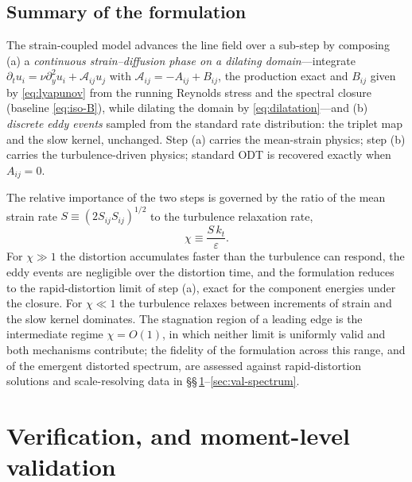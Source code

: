 \documentclass[lineno]{JFM-FLM_Au}
\begin{document}
\subsection{Summary of the formulation}\label{sec:summary}

The strain-coupled model advances the line field over a sub-step by
composing (a) a \emph{continuous strain--diffusion phase on a dilating
domain}---integrate
$\partial_t u_i=\nu\partial_y^2u_i+\mathcal{A}_{ij}u_j$ with
$\mathcal{A}_{ij}=-A_{ij}+B_{ij}$, the production exact and $B_{ij}$
given by \eqref{eq:lyapunov} from the running Reynolds stress and the
spectral closure (baseline \eqref{eq:iso-B}), while dilating the domain
by \eqref{eq:dilatation}---and (b) \emph{discrete eddy events} sampled
from the standard rate distribution: the triplet map and the slow kernel,
unchanged. Step (a) carries the mean-strain physics; step (b) carries the
turbulence-driven physics; standard ODT is recovered exactly when
$A_{ij}=0$.

The relative importance of the two steps is governed by the ratio of the
mean strain rate $S\equiv(2S_{ij}S_{ij})^{1/2}$ to the turbulence
relaxation rate,
\begin{equation}
  \chi \equiv \frac{S\,k_t}{\varepsilon}.
  \label{eq:chi}
\end{equation}
For $\chi\gg1$ the distortion accumulates faster than the turbulence can
respond, the eddy events are negligible over the distortion time, and the
formulation reduces to the rapid-distortion limit of step (a), exact for
the component energies under the closure. For $\chi\ll1$ the turbulence
relaxes between increments of strain and the slow kernel dominates. The
stagnation region of a leading edge is the intermediate regime
$\chi=O(1)$, in which neither limit is uniformly valid and both
mechanisms contribute; the fidelity of the formulation across this range,
and of the emergent distorted spectrum, are assessed against
rapid-distortion solutions and scale-resolving data in
\S\S\,\ref{sec:verification}--\ref{sec:val-spectrum}.

\section{Verification, and moment-level validation}\label{sec:verification}
\end{document}
